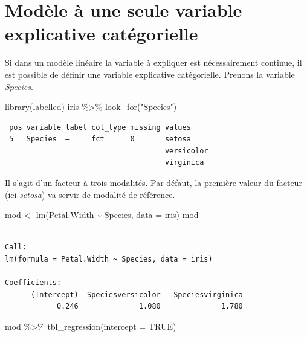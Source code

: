 \documentclass[
  letterpaper,
  DIV=11,
  numbers=noendperiod,
  oneside]{scrreprt}
\newenvironment{Shaded}{\begin{snugshade}}{\end{snugshade}}
\newcommand{\AttributeTok}[1]{\textcolor[rgb]{0.40,0.45,0.13}{#1}}
\newcommand{\ConstantTok}[1]{\textcolor[rgb]{0.56,0.35,0.01}{#1}}
\newcommand{\FunctionTok}[1]{\textcolor[rgb]{0.28,0.35,0.67}{#1}}
\newcommand{\NormalTok}[1]{\textcolor[rgb]{0.00,0.23,0.31}{#1}}
\newcommand{\OtherTok}[1]{\textcolor[rgb]{0.00,0.23,0.31}{#1}}
\newcommand{\SpecialCharTok}[1]{\textcolor[rgb]{0.37,0.37,0.37}{#1}}
\newcommand{\StringTok}[1]{\textcolor[rgb]{0.13,0.47,0.30}{#1}}
\begin{document}
\hypertarget{sec-regression-lineaire-variable-explicative-categorielle}{%
\section{Modèle à une seule variable explicative
catégorielle}\label{sec-regression-lineaire-variable-explicative-categorielle}}

Si dans un modèle linéaire la variable à expliquer est nécessairement
continue, il est possible de définir une variable explicative
catégorielle. Prenons la variable \emph{Species}.

\begin{Shaded}
\begin{Highlighting}[]
\FunctionTok{library}\NormalTok{(labelled)}
\NormalTok{iris }\SpecialCharTok{\%\textgreater{}\%} \FunctionTok{look\_for}\NormalTok{(}\StringTok{"Species"}\NormalTok{)}
\end{Highlighting}
\end{Shaded}

\begin{verbatim}
 pos variable label col_type missing values    
 5   Species  —     fct      0       setosa    
                                     versicolor
                                     virginica 
\end{verbatim}

Il s'agit d'un facteur à trois modalités. Par défaut, la première valeur
du facteur (ici \emph{setosa}) va servir de modalité de référence.

\begin{Shaded}
\begin{Highlighting}[]
\NormalTok{mod }\OtherTok{\textless{}{-}} \FunctionTok{lm}\NormalTok{(Petal.Width }\SpecialCharTok{\textasciitilde{}}\NormalTok{ Species, }\AttributeTok{data =}\NormalTok{ iris)}
\NormalTok{mod}
\end{Highlighting}
\end{Shaded}

\begin{verbatim}

Call:
lm(formula = Petal.Width ~ Species, data = iris)

Coefficients:
      (Intercept)  Speciesversicolor   Speciesvirginica  
            0.246              1.080              1.780  
\end{verbatim}

\begin{Shaded}
\begin{Highlighting}[]
\NormalTok{mod }\SpecialCharTok{\%\textgreater{}\%}
  \FunctionTok{tbl\_regression}\NormalTok{(}\AttributeTok{intercept =} \ConstantTok{TRUE}\NormalTok{)}
\end{Highlighting}
\end{Shaded}
\end{document}
